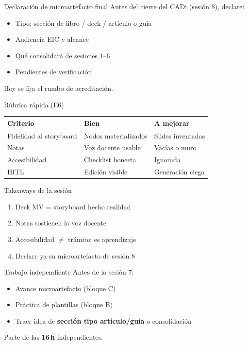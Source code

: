 \documentclass[aspectratio=169,11pt]{beamer}
\begin{document}
\begin{frame}{Declaración de microartefacto final}
Antes del cierre del CADi (sesión 8), declare:
\begin{itemize}
\item Tipo: sección de libro / deck / artículo o guía
\item Audiencia EIC y alcance
\item Qué consolidará de sesiones 1--6
\item Pendientes de verificación
\end{itemize}
Hoy se fija el rumbo de acreditación.
\end{frame}

\begin{frame}{Rúbrica rápida (E6)}
\begin{tabularx}{\textwidth}{@{}lXX@{}}
\toprule
Criterio & Bien & A mejorar \\
\midrule
Fidelidad al storyboard & Nodos materializados & Slides inventadas \\
Notas & Voz docente usable & Vacías o muro \\
Accesibilidad & Checklist honesta & Ignorada \\
HITL & Edición visible & Generación ciega \\
\bottomrule
\end{tabularx}
\end{frame}

\begin{frame}{Takeaways de la sesión}
\begin{enumerate}
\item Deck MV = storyboard hecho realidad
\item Notas sostienen la voz docente
\item Accesibilidad $\neq$ trámite: es aprendizaje
\item Declare ya su microartefacto de sesión 8
\end{enumerate}
\end{frame}

\begin{frame}{Trabajo independiente}
Antes de la sesión 7:
\begin{itemize}
\item Avance microartefacto (bloque C)
\item Práctica de plantillas (bloque B)
\item Traer idea de \textbf{sección tipo artículo/guía} o consolidación
\end{itemize}
Parte de las \textbf{16\,h} independientes.
\end{frame}
\end{document}
